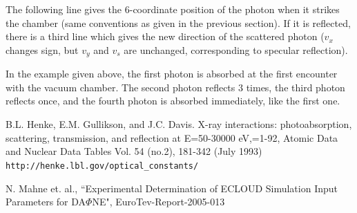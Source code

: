 \documentclass[11pt]{article}
\begin{document}
The following line gives the 6-coordinate position of the photon when
it strikes the chamber (same conventions as given in the previous
section). If it is reflected, there is a third line which gives the
new direction of the scattered photon ($v_x$ changes sign, but $v_y$
and $v_s$ are unchanged, corresponding to specular reflection).

In the example given above, the first photon is absorbed at the first
encounter with the vacuum chamber. The second photon reflects 3 times,
the third photon reflects once, and the fourth photon is absorbed
immediately, like the first one.

\begin{thebibliography}{9}

B.L. Henke, E.M. Gullikson, and J.C. Davis. X-ray
interactions: photoabsorption, scattering, transmission, and
reflection at E=50-30000 eV,=1-92, Atomic Data and Nuclear Data
Tables Vol. 54 (no.2), 181-342 (July 1993) {\tt
http://henke.lbl.gov/optical\_constants/}

N. Mahne et. al., ``Experimental Determination of ECLOUD Simulation Input
Parameters for DA$\Phi$NE", EuroTev-Report-2005-013

\end{thebibliography}
\end{document}
